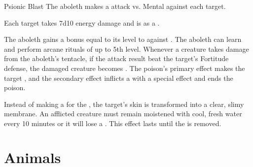     \begin{freeability}{Psionic Blast}
       The aboleth makes a  attack
        vs. Mental against each target.
    
    \hit Each target takes 7d10 energy damage and is  as a .
    \end{freeability}
  
       The aboleth gains a bonus equal to its level to  against .
     The aboleth can learn and perform arcane rituals of up to 5th level.
        Whenever a creature takes damage from the aboleth's tentacle,
          if the attack result beat the target's Fortitude defense,
          the damaged creature becomes .
        The poison's primary effect makes the target ,
          and the secondary effect inflicts a  with a special effect and ends the poison.

        Instead of making a  for the ,
          the target's skin is transformed into a clear, slimy membrane.
        An afflicted creature must remain moistened with cool, fresh water every 10 minutes
          or it will lose a .
        This effect lasts until the  is removed.
  
        \section{Animals}
      
